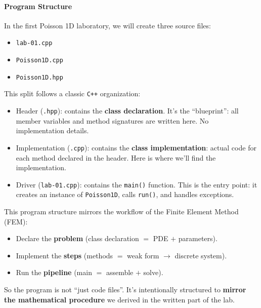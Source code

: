 \paragraph{Program Structure}

In the first Poisson 1D laboratory, we will create three source files:
\begin{itemize}
    \item \texttt{lab-01.cpp}
    \item \texttt{Poisson1D.cpp}
    \item \texttt{Poisson1D.hpp}
\end{itemize}
This split follows a classic \texttt{C++} organization:
\begin{itemize}
    \item Header (\texttt{.hpp}): contains the \textbf{class declaration}. It's the ``blueprint'': all member variables and method signatures are written here. No implementation details.
    \item Implementation (\texttt{.cpp}): contains the \textbf{class implementation}: actual code for each method declared in the header. Here is where we'll find the implementation.
    \item Driver (\texttt{lab-01.cpp}): contains the \texttt{main()} function. This is the entry point: it creates an instance of \texttt{Poisson1D}, calls \texttt{run()}, and handles exceptions.
\end{itemize}
This program structure mirrors the workflow of the Finite Element Method (FEM):
\begin{itemize}
    \item Declare the \textbf{problem} (class declaration $=$ PDE $+$ parameters).
    \item Implement the \textbf{steps} (methods $=$ weak form $\rightarrow$ discrete system).
    \item Run the \textbf{pipeline} (main $=$ assemble $+$ solve).
\end{itemize}
So the program is not ``just code files''. It's intentionally structured to \textbf{mirror the mathematical procedure} we derived in the written part of the lab.